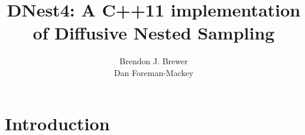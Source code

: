 \documentclass[a4paper, 12pt]{article}
\title{DNest4: A C++11 implementation of Diffusive Nested Sampling}
\author{Brendon J. Brewer\\
Dan Foreman-Mackey}
\date{}
\begin{document}
\maketitle


\setlength{\parindent}{0pt}
\setlength{\parskip}{8pt}

\section{Introduction}

\begin{thebibliography}{999}
\end{thebibliography}
\end{document}
